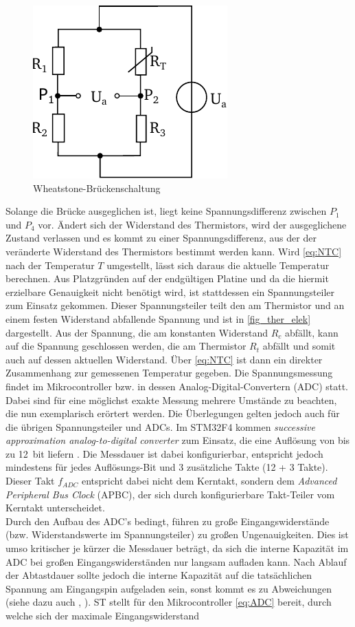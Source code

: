 \begin{figure} [h]
	\centering
	\includegraphics[width=0.4\linewidth]{Bilder/wheatstone.pdf}
	\caption{Wheatstone-Brückenschaltung}
	\label{fig:wheatstone}
\end{figure}\noindent
Solange die Brücke ausgeglichen ist, liegt keine Spannungsdifferenz zwischen $P_1$ und $P_4$ vor. Ändert sich der Widerstand des Thermistors, wird der ausgeglichene Zustand verlassen und es kommt zu einer Spannungsdifferenz, aus der der veränderte Widerstand des Thermistors bestimmt werden kann. Wird \autoref{eq:NTC} nach der Temperatur $T$ umgestellt, lässt sich daraus die aktuelle Temperatur berechnen. Aus Platzgründen auf der endgültigen Platine und da die hiermit erzielbare Genauigkeit nicht benötigt wird, ist stattdessen ein Spannungsteiler zum Einsatz gekommen. Dieser Spannungsteiler teilt den am Thermistor und an einem festen Widerstand abfallende Spannung und ist in \autoref{fig_ther_elek} dargestellt. Aus der Spannung, die am konstanten Widerstand $R_c$ abfällt, kann auf die Spannung geschlossen werden, die am Thermistor $R_t$ abfällt und somit auch auf dessen aktuellen Widerstand. Über \autoref{eq:NTC} ist dann ein direkter Zusammenhang zur gemessenen Temperatur gegeben.
Die Spannungsmessung findet im Mikrocontroller bzw. in dessen Analog-Digital-Convertern (ADC) statt. Dabei sind für eine möglichst exakte Messung mehrere Umstände zu beachten, die nun exemplarisch erörtert werden. Die Überlegungen gelten jedoch auch für die übrigen Spannungsteiler und ADCs. Im STM32F4 kommen \textit{successive approximation analog-to-digital converter} zum Einsatz, die eine Auflösung von bis zu \SI{12}{bit} liefern \cite{stmref}. Die Messdauer ist dabei konfigurierbar, entspricht jedoch mindestens für jedes Auflösungs-Bit und 3 zusätzliche Takte (12 + 3 Takte)\cite[S.397]{stmref}. Dieser Takt $f_{ADC}$ entspricht dabei nicht dem Kerntakt, sondern dem \textit{Advanced Peripheral Bus Clock} (APBC), der sich durch konfigurierbare Takt-Teiler vom Kerntakt unterscheidet. \\
Durch den Aufbau des ADC's bedingt, führen zu große Eingangswiderstände (bzw. Widerstandswerte im Spannungsteiler) zu großen Ungenauigkeiten. Dies ist umso kritischer je kürzer die Messdauer beträgt, da sich die interne Kapazität im ADC bei großen Eingangswiderständen nur langsam aufladen kann. Nach Ablauf der Abtastdauer sollte  jedoch die interne Kapazität auf die tatsächlichen Spannung am Eingangspin aufgeladen sein, sonst kommt es zu Abweichungen (siehe dazu auch \cite{ADC}, \cite{stm32}). ST stellt für den Mikrocontroller \autoref{eq:ADC} bereit, durch welche sich der maximale Eingangswiderstand 
